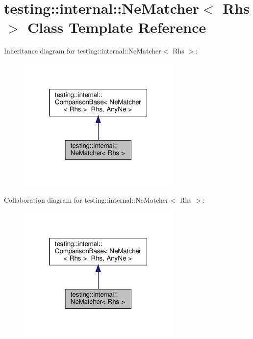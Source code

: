 \hypertarget{classtesting_1_1internal_1_1_ne_matcher}{}\section{testing\+:\+:internal\+:\+:Ne\+Matcher$<$ Rhs $>$ Class Template Reference}
\label{classtesting_1_1internal_1_1_ne_matcher}


Inheritance diagram for testing\+:\+:internal\+:\+:Ne\+Matcher$<$ Rhs $>$\+:
\nopagebreak
\begin{figure}[H]
\begin{center}
\leavevmode
\includegraphics[width=229pt]{classtesting_1_1internal_1_1_ne_matcher__inherit__graph}
\end{center}
\end{figure}


Collaboration diagram for testing\+:\+:internal\+:\+:Ne\+Matcher$<$ Rhs $>$\+:
\nopagebreak
\begin{figure}[H]
\begin{center}
\leavevmode
\includegraphics[width=229pt]{classtesting_1_1internal_1_1_ne_matcher__coll__graph}
\end{center}
\end{figure}

